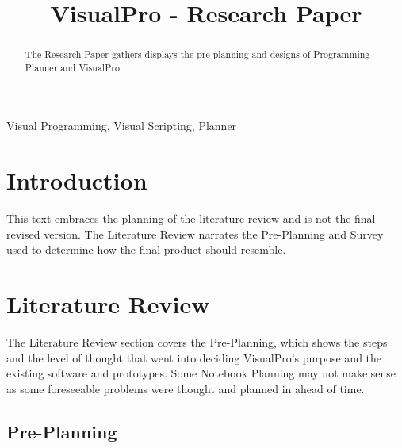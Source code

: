 \documentclass[conference]{IEEEtran}
\begin{document}
	\title{VisualPro - Research Paper}

	\author{
	}

     \maketitle
    
    \thispagestyle{plain}
    \pagestyle{plain}
    
    \tableofcontents
    \newpage
    \begin{abstract}
       The Research Paper gathers displays the pre-planning and designs of Programming Planner and VisualPro. 
    \end{abstract}

    \begin{IEEEkeywords}
        Visual Programming, Visual Scripting, Planner
    \end{IEEEkeywords}

    \section{Introduction}
        This text embraces the planning of the literature review and is not the final revised version. The Literature Review narrates the Pre-Planning and Survey used to determine how the final product should resemble. 
        
      \section{Literature Review}
        The Literature Review section covers the Pre-Planning, which shows the steps and the level of thought that went into deciding VisualPro's purpose and the existing software and prototypes. Some Notebook Planning may not make sense as some foreseeable problems were thought and planned in ahead of time.

      \subsection{Pre-Planning}
\end{document}
